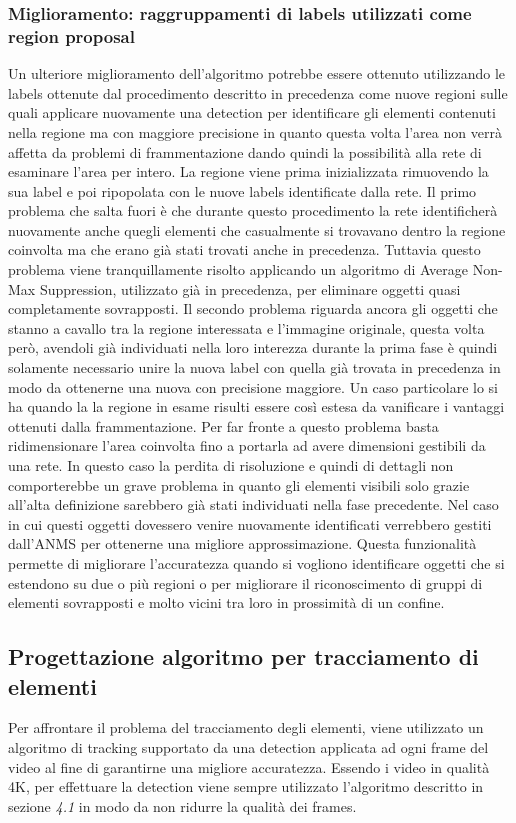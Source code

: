 \subsubsection{Miglioramento: raggruppamenti di labels utilizzati come region proposal}
Un ulteriore miglioramento dell'algoritmo potrebbe essere ottenuto utilizzando le labels ottenute dal procedimento descritto in precedenza come nuove regioni sulle quali applicare nuovamente una detection per identificare gli elementi contenuti nella regione ma con maggiore precisione in quanto questa volta l'area non verrà affetta da problemi di frammentazione dando quindi la possibilità alla rete di esaminare l'area per intero. La regione viene prima inizializzata rimuovendo la sua label e poi ripopolata con le nuove labels identificate dalla rete.
Il primo problema che salta fuori è che durante questo procedimento la rete identificherà nuovamente anche quegli elementi che casualmente si trovavano dentro la regione coinvolta ma che erano già stati trovati anche in precedenza. Tuttavia questo problema viene tranquillamente risolto applicando un algoritmo di Average Non-Max Suppression, utilizzato già in precedenza, per eliminare oggetti quasi completamente sovrapposti. Il secondo problema riguarda ancora gli oggetti che stanno a cavallo tra la regione interessata e l'immagine originale, questa volta però, avendoli già individuati nella loro interezza durante la prima fase è quindi solamente necessario unire la nuova label con quella già trovata in precedenza in modo da ottenerne una nuova con precisione maggiore. 
Un caso particolare lo si ha quando la la regione in esame risulti essere così estesa da vanificare i vantaggi ottenuti dalla frammentazione. Per far fronte a questo problema basta ridimensionare l'area coinvolta fino a portarla ad avere dimensioni gestibili da una rete. In questo caso la perdita di risoluzione e quindi di dettagli non comporterebbe un grave problema in quanto gli elementi visibili solo grazie all'alta definizione sarebbero già stati individuati nella fase precedente. Nel caso in cui questi oggetti dovessero venire nuovamente identificati verrebbero gestiti dall'ANMS per ottenerne una migliore approssimazione. Questa funzionalità permette di migliorare l'accuratezza quando si vogliono identificare oggetti che si estendono su due o più regioni o per migliorare il riconoscimento di gruppi di elementi sovrapposti e molto vicini tra loro in prossimità di un confine.
\subsection{Progettazione algoritmo per tracciamento di elementi}
Per affrontare il problema del tracciamento degli elementi, viene utilizzato un algoritmo di tracking supportato da una detection applicata ad ogni frame del video al fine di garantirne una migliore accuratezza. Essendo i video in  qualità 4K, per effettuare la detection viene sempre utilizzato l'algoritmo descritto in sezione \textit{4.1} in modo da non ridurre la qualità dei frames.
